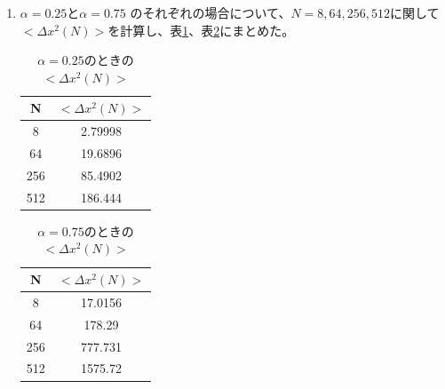 \documentclass{jsarticle}
\begin{document}
\begin{enumerate}
                \begin{enumerate}
                    \item $\alpha=0.25$と$\alpha = 0.75$  のそれぞれの場合について、$N=8,64,256,512$に関して$<\Delta x^{2}(N)>$を計算し、表\ref{tab:1}、表\ref{tab:2}にまとめた。
                    
                    \begin{table}[H]
                        \begin{center}
                            \caption{$\alpha=0.25$のときの$<\Delta x^{2}(N)>$}
                            \begin{tabular}{c|c} \hline
                                
                                N  &  $<\Delta x^{2}(N)>$ \\ \hline
                                8 &  2.79998 \\
                                64 & 19.6896 \\
                                256 &  85.4902 \\
                                512 & 186.444 \\ \hline

                            \end{tabular}
                            \label{tab:1}
                        \end{center}
                    \end{table}
                    
                    \begin{table}[H]
                        \begin{center}
                            \caption{$\alpha=0.75$のときの$<\Delta x^{2}(N)>$}
                            \begin{tabular}{c|c} \hline
                                
                                N  &  $<\Delta x^{2}(N)>$ \\ \hline
                                8 &  17.0156 \\
                                64 & 178.29 \\
                                256 &  777.731 \\
                                512 & 1575.72 \\ \hline

                            \end{tabular}
                            \label{tab:2}
                        \end{center}
                    \end{table}
                

\end{enumerate}
\end{enumerate}
\end{document}
